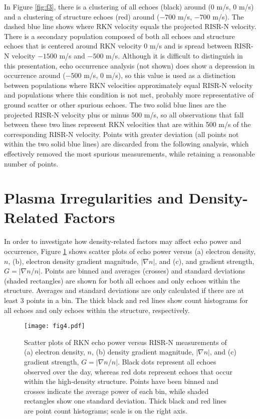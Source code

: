 In Figure \ref{fig:f3}, there is a clustering of all echoes (black) around (0 m/s, 0 m/s) and a clustering of structure echoes (red) around (\(-700\) m/s, \(-700\) m/s).  The dashed blue line shows where RKN velocity equals the projected RISR-N velocity.  There is a secondary population composed of both all echoes and structure echoes that is centered around RKN velocity 0 m/s and is spread between RISR-N velocity \(-1500\) m/s and \(-500\) m/s.  Although it is difficult to distinguish in this presentation, echo occurrence analysis (not shown) does show a depression in occurrence around (\(-500\) m/s, 0 m/s), so this value is used as a distinction between populations where RKN velocities approximately equal RISR-N velocity and populations where this condition is not met, probably more representative of ground scatter or other spurious echoes.  The two solid blue lines are the projected RISR-N velocity plus or minus 500 m/s, so all observations that fall between these two lines represent RKN velocities that are within 500 m/s of the corresponding RISR-N velocity.  Points with greater deviation (all points not within the two solid blue lines) are discarded from the following analysis, which effectively removed the most spurious measurements, while retaining a reasonable number of points.

\section{Plasma Irregularities and Density-Related Factors}
In order to investigate how density-related factors may affect echo power and occurrence, Figure \ref{fig:f4} shows scatter plots of echo power versus (a) electron density, \(n\), (b), electron density gradient magnitude, \(|\nabla n|\), and (c), and gradient strength, \(G = |\nabla n/n|\). Points are binned and averages (crosses) and standard deviations (shaded rectangles) are shown for both all echoes and only echoes within the structure.  Averages and standard deviations are only calculated if there are at least 3 points in a bin.  The thick black and red lines show count histograms for all echoes and only echoes within the structure, respectively.

\begin{figure}
\texttt{[image: fig4.pdf]}
  \caption{Scatter plots of RKN echo power versus RISR-N measurements of (a) electron density, \(n\), (b) density gradient magnitude, \(|\nabla n|\), and (c) gradient strength, \(G=|\nabla n/n|\).  Black dots represent all echoes observed over the day, whereas red dots represent echoes that occur within the high-density structure.  Points have been binned and crosses indicate the average power of each bin, while shaded rectangles show one standard deviation. Thick black and red lines are point count histograms; scale is on the right axis.}
  \label{fig:f4}
\end{figure}

